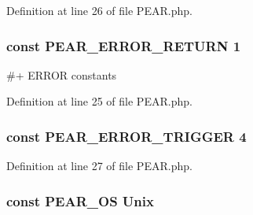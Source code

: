 Definition at line 26 of file P\+E\+A\+R.\+php.

\subsubsection[{\texorpdfstring{P\+E\+A\+R\+\_\+\+E\+R\+R\+O\+R\+\_\+\+R\+E\+T\+U\+RN}{PEAR_ERROR_RETURN}}]{\setlength{\rightskip}{0pt plus 5cm}const P\+E\+A\+R\+\_\+\+E\+R\+R\+O\+R\+\_\+\+R\+E\+T\+U\+RN 1}\hypertarget{PEAR_8php_a90d8915cb5b94d81cd4e1efa9c75c66a}{}\label{PEAR_8php_a90d8915cb5b94d81cd4e1efa9c75c66a}
\#+ E\+R\+R\+OR constants 

Definition at line 25 of file P\+E\+A\+R.\+php.

\subsubsection[{\texorpdfstring{P\+E\+A\+R\+\_\+\+E\+R\+R\+O\+R\+\_\+\+T\+R\+I\+G\+G\+ER}{PEAR_ERROR_TRIGGER}}]{\setlength{\rightskip}{0pt plus 5cm}const P\+E\+A\+R\+\_\+\+E\+R\+R\+O\+R\+\_\+\+T\+R\+I\+G\+G\+ER 4}\hypertarget{PEAR_8php_a23a071419e1d6bbb554976e21d978d56}{}\label{PEAR_8php_a23a071419e1d6bbb554976e21d978d56}


Definition at line 27 of file P\+E\+A\+R.\+php.

\subsubsection[{\texorpdfstring{P\+E\+A\+R\+\_\+\+OS}{PEAR_OS}}]{\setlength{\rightskip}{0pt plus 5cm}const P\+E\+A\+R\+\_\+\+OS \textquotesingle{}Unix\textquotesingle{}}\hypertarget{PEAR_8php_a5fd2c8f5bc659f777ab39b8bfd745c4c}{}\label{PEAR_8php_a5fd2c8f5bc659f777ab39b8bfd745c4c}


